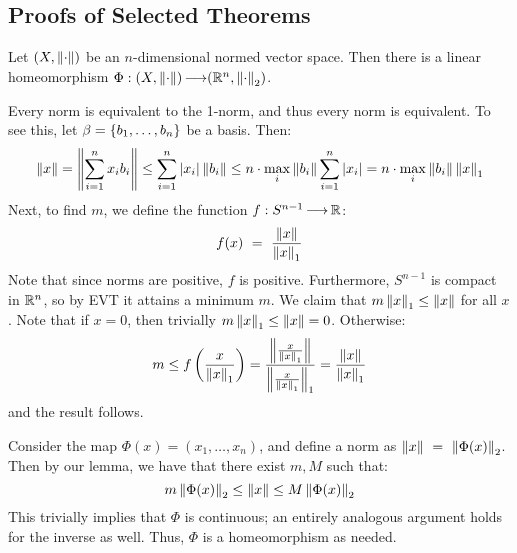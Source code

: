 \subsection{Proofs of Selected Theorems}

\begin{thm}[num=6.4] %
    Let $ (X, \left\|\cdot\right\|) $ be an $ n $-dimensional normed vector space.
    Then there is a linear homeomorphism $ \Phi: (X, \left\|\cdot\right\|) \operatorname{\longrightarrow}
    (\mathbb{R}^{n}, \left\|\cdot\right\|_{2}) $.
\end{thm}

\begin{lm}
    Every norm is equivalent to the 1-norm, and thus every norm is equivalent.
    \vsp
    To see this, let $ \beta=\left\{{b_{1},\dots,b_{n}}\right\} $ be a basis. Then:
    \begin{equation*}
        \left\|x\right\| = \left\|\sum_{i=1}^{n}x_{i}b_{i}\right\| \leq \sum_{i=1}^{n}
        \abs{x_{i}}\left\|b_{i}\right\| \leq n\cdot\max_{i}\left\|b_{i}\right\|\sum_{i=1}^{n}
        \abs{x_{i}} = n\cdot\max_{i}\left\|b_{i}\right\|\left\|x\right\|_{1}
    \end{equation*}
    Next, to find $ m $, we define the function $ f:S^{n-1} \operatorname{\longrightarrow} \mathbb{R} $:
    \begin{equation*}
        f(x) \ = \ \frac{\norm{x}}{\norm{x}_{1}}
    \end{equation*}
    Note that since norms are positive, $ f $ is positive. Furthermore,
    $ S^{n-1} $ is compact in $ \mathbb{R}^{n} $, so by EVT it attains a minimum $ m $.
    We claim that $ m\left\|x\right\|_{1} \leq \left\|x\right\| $ for all $ x $.
    Note that if $ x = 0 $, then trivially $ m\left\|x\right\|_{1} \leq \left\|x\right\| = 0 $.
    Otherwise:
    \begin{equation*}
        m \leq f \left( \frac{x}{\left\|x\right\|_{1}} \right) =
        \frac{\left\|\frac{x}{\left\|x\right\|_{1}}\right\|}{\left\|\frac{x}{\left\|x\right\|_{1}}\right\|_{1}} =
        \frac{\left\|x\right\|}{\left\|x\right\|_{1}}
    \end{equation*}
    and the result follows.
\end{lm}

\newpage
\begin{pf}
    Consider the map $ \Phi(x) = (x_{1},\dots,x_{n}) $, and define a norm as
    $ \norm{x} \ = \ \norm{\Phi(x)}_{2} $. Then by our lemma, we have that there
    exist $ m, M $ such that:
    \begin{equation*}
        m\left\|\Phi(x)\right\|_{2} \leq \left\|x\right\| \leq M\left\|\Phi(x)\right\|_{2}
    \end{equation*}
    This trivially implies that $ \Phi $ is continuous; an entirely analogous
    argument holds for the inverse as well. Thus, $ \Phi $ is a homeomorphism as
    needed.
\end{pf}


